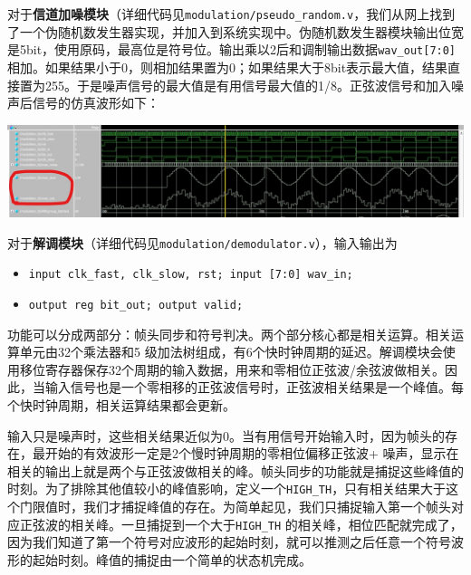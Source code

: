 对于\textbf{信道加噪模块}（详细代码见\texttt{modulation/pseudo\_random.v}，我们从网上找到了一个伪随机数发生器实现，并加入到系统实现中。伪随机数发生器模块输出位宽是5bit，使用原码，最高位是符号位。输出乘以2后和调制输出数据\texttt{wav\_out[7:0]} 相加。如果结果小于0，则相加结果置为0；如果结果大于8bit表示最大值，结果直接置为255。于是噪声信号的最大值是有用信号最大值的1/8。正弦波信号和加入噪声后信号的仿真波形如下：\par
\vspace{10pt}
\includegraphics[width = .9\textwidth]{images//noise_addition.jpg}\vspace{10pt}\par

对于\textbf{解调模块}（详细代码见\texttt{modulation/demodulator.v}），输入输出为
\begin{itemize}
\item \texttt{input clk\_fast, clk\_slow, rst; input [7:0] wav\_in;}
\item \texttt{output reg bit\_out; output valid;}
\end{itemize}
功能可以分成两部分：帧头同步和符号判决。两个部分核心都是相关运算。相关运算单元由32个乘法器和5 级加法树组成，有6个快时钟周期的延迟。解调模块会使用移位寄存器保存32个周期的输入数据，用来和零相位正弦波/余弦波做相关。因此，当输入信号也是一个零相移的正弦波信号时，正弦波相关结果是一个峰值。每个快时钟周期，相关运算结果都会更新。\par

输入只是噪声时，这些相关结果近似为0。当有用信号开始输入时，因为帧头的存在，最开始的有效波形一定是2个慢时钟周期的零相位偏移正弦波+ 噪声，显示在相关的输出上就是两个与正弦波做相关的峰。帧头同步的功能就是捕捉这些峰值的时刻。为了排除其他值较小的峰值影响，定义一个\texttt{HIGH\_TH}，只有相关结果大于这个门限值时，我们才捕捉峰值的存在。为简单起见，我们只捕捉输入第一个帧头对应正弦波的相关峰。一旦捕捉到一个大于\texttt{HIGH\_TH} 的相关峰，相位匹配就完成了，因为我们知道了第一个符号对应波形的起始时刻，就可以推测之后任意一个符号波形的起始时刻。峰值的捕捉由一个简单的状态机完成。\par

